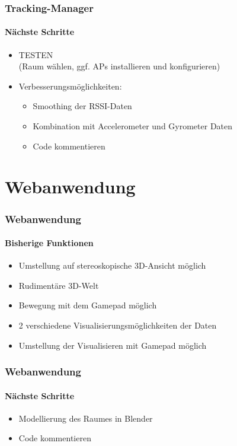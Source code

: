 \documentclass{beamer}
\begin{document}
\begin{frame}
\frametitle{Tracking-Manager}
\framesubtitle{N\"achste Schritte}
\begin{itemize}
  \item TESTEN\\
  		(Raum w\"ahlen, ggf. APs installieren und konfigurieren)
  \item Verbesserungsm\"oglichkeiten:
  		\begin{itemize}
  		\item	Smoothing der RSSI-Daten
  		\item	Kombination mit Accelerometer und Gyrometer Daten
      \item Code kommentieren
  		\end{itemize}
\end{itemize}
\end{frame}


\section{Webanwendung}

\begin{frame}
\frametitle{Webanwendung}
\framesubtitle{Bisherige Funktionen}
\begin{itemize}
  \item Umstellung auf stereoskopische 3D-Ansicht m\"oglich
  \item Rudiment\"are 3D-Welt
  \item Bewegung mit dem Gamepad m\"oglich
  \item 2 verschiedene Visualisierungsm\"oglichkeiten der Daten
  \item Umstellung der Visualisieren mit Gamepad m\"oglich
\end{itemize}
\end{frame}

\begin{frame}
\frametitle{Webanwendung}
\framesubtitle{N\"achste Schritte}
\begin{itemize}
  \item Modellierung des Raumes in Blender
  \item Code kommentieren
\end{itemize}
\end{frame}
\end{document}
